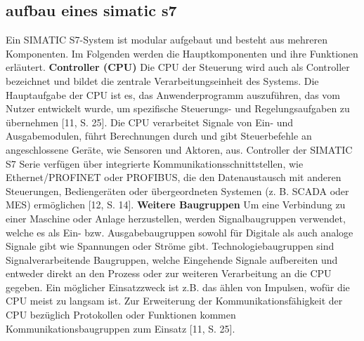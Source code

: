 \subsection{aufbau eines simatic s7}
Ein SIMATIC S7-System ist modular aufgebaut und besteht aus mehreren Komponenten. Im 
Folgenden werden die Hauptkomponenten und ihre Funktionen erläutert.
\textbf{Controller (CPU)}
Die CPU der Steuerung wird auch als Controller bezeichnet und bildet die zentrale Verarbeitungseinheit des Systems. Die Hauptaufgabe der CPU ist es, das Anwenderprogramm auszuführen, das vom Nutzer entwickelt wurde, um spezifische Steuerungs- und Regelungsaufgaben 
zu übernehmen [11, S. 25]. Die CPU verarbeitet Signale von Ein- und Ausgabemodulen, führt 
Berechnungen durch und gibt Steuerbefehle an angeschlossene Geräte, wie Sensoren und Aktoren, aus.
Controller der SIMATIC S7 Serie verfügen über integrierte Kommunikationsschnittstellen, wie 
Ethernet/PROFINET oder PROFIBUS, die den Datenaustausch mit anderen Steuerungen, 
Bediengeräten oder übergeordneten Systemen (z. B. SCADA oder MES) ermöglichen [12, S. 
14]. 
\textbf{Weitere Baugruppen}
Um eine Verbindung zu einer Maschine oder Anlage herzustellen, werden Signalbaugruppen
verwendet, welche es als Ein- bzw. Ausgabebaugruppen sowohl für Digitale als auch analoge 
Signale gibt wie Spannungen oder Ströme gibt. Technologiebaugruppen sind Signalverarbeitende Baugruppen, welche Eingehende Signale aufbereiten und entweder direkt an den Prozess 
oder zur weiteren Verarbeitung an die CPU gegeben. Ein möglicher Einsatzzweck ist z.B. das
ählen von Impulsen, wofür die CPU meist zu langsam ist. Zur Erweiterung der Kommunikationsfähigkeit der CPU bezüglich Protokollen oder Funktionen kommen Kommunikationsbaugruppen zum Einsatz [11, S. 25]. 
